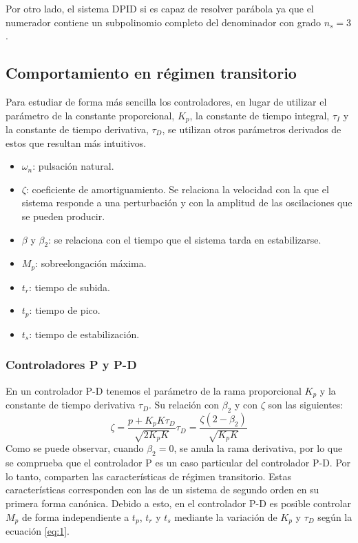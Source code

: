 \documentclass[a4paper]{article}
\begin{document}
 Por otro lado, el sistema D\textbar PID si es capaz de resolver parábola ya que el numerador contiene un subpolinomio completo del denominador con grado $n_s=3$.

\subsection{Comportamiento en régimen transitorio}
Para estudiar de forma más sencilla los controladores, en lugar de utilizar el parámetro de la constante proporcional, $K_p$, la constante de tiempo integral, $\tau_I$ y la constante de tiempo derivativa, $\tau_D$, se utilizan otros parámetros derivados de estos que resultan más intuitivos.
\begin{itemize}
	\item $\omega_n$: pulsación natural.
	\item $\zeta$: coeficiente de amortiguamiento. Se relaciona la velocidad con la que el sistema responde a una perturbación y con la amplitud de las oscilaciones que se pueden producir.
	\item $\beta$ y $\beta_2$: se relaciona con el tiempo que el sistema tarda en estabilizarse.
	\item $M_p$: sobreelongación máxima.
	\item $t_r$: tiempo de subida.
	\item $t_p$: tiempo de pico.
	\item $t_s$: tiempo de estabilización.
\end{itemize}
\subsubsection{Controladores P y P-D}
En un controlador P-D tenemos el parámetro de la rama proporcional $K_p$ y la constante de tiempo derivativa $\tau_D$. Su relación con $\beta_2$ y con $\zeta$ son las siguientes:
\begin{subequations}
	\begin{equation}
		\zeta= \frac{p+K_p K \tau_D}{\sqrt{2 K_p K}}
	\end{equation}
	\begin{equation}
		\tau_D= \frac{\zeta (2-\beta_2)}{\sqrt{K_p K}}
	\end{equation}
	\label{eq:1}
\end{subequations}
Como se puede observar, cuando $\beta_2=0$, se anula la rama derivativa, por lo que se comprueba que el controlador P es un caso particular del controlador P-D. Por lo tanto, comparten las características de régimen transitorio. Estas características corresponden con las de un sistema de segundo orden en su primera forma canónica. Debido a esto, en el controlador P-D es posible controlar $M_p$ de forma independiente a $t_p$, $t_r$ y $t_s$ mediante la variación de $K_p$ y $\tau_D$ según la ecuación \ref{eq:1}.
\end{document}
